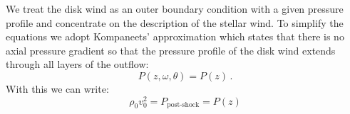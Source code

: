 We treat the disk wind as an outer boundary condition with a given pressure profile and concentrate on the description of the stellar wind. To simplify the equations we adopt Kompaneets' approximation \citep{1960SPhD....5...46K} which states that there is no axial pressure gradient so that the pressure profile of the disk wind extends through all layers of the outflow:
\begin{equation}
P(z, \omega, \theta) = P(z)\,.
\end{equation}
With this we can write:
\begin{equation}\label{eqn:Pofz}
\rho_0 v_0^2 = P_{\textrm{post-shock}} = P(z)
\end{equation}
